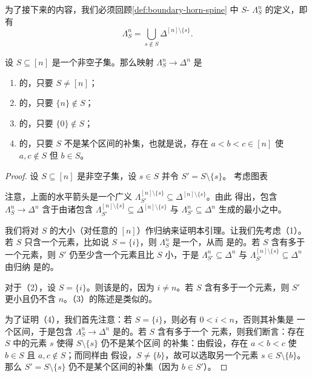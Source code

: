 为了接下来的内容，我们必须回顾\cref{def:boundary-horn-spine} 中 $S$-\trHorn{}%
$\Lambda^n_S$ 的定义，即有
\[
\Lambda^n_S = \bigcup_{s \notin S} \Delta^{[n]\setminus\{s\}}.
\]

\begin{lemma}\label{lem:s-horn-anodyne}
设 $S \subseteq [n]$ 是一个非空子集。那么映射 $\Lambda^n_S \to \Delta^n$ 是
\begin{enumerate}[label=(\arabic*)]
  \item \trAnodyne{}的，只要 $S \ne [n]$；
  \item \trLeftAnodyne{}的，只要 $\{n\} \notin S$；
  \item \trRightAnodyne{}的，只要 $\{0\} \notin S$；
  \item \trInnerAnodyne{}的，只要 $S$ 不是某个区间的补集，也就是说，存在
  $a < b < c \in [n]$ 使 $a, c \notin S$ 但 $b \in S$。
\end{enumerate}
\end{lemma}

\begin{proof}
设 $S \subseteq [n]$ 是非空子集，设 $s \in S$ 并令 $S' = S \setminus \{s\}$。
考虑\trPushout{}图表
\begin{center}
\end{center}
注意，上面的水平箭头是一个广义\trHornInclusion{}%
$\Lambda^{[n]\setminus\{s\}}_{S'} \subseteq \Delta^{[n]\setminus\{s\}}$。由此
得出，包含 $\Lambda^n_S \to \Delta^n$ 含于由诸包含
$\Lambda^{[n]\setminus\{s\}}_{S'} \subseteq \Delta^{[n]\setminus\{s\}}$ 与
$\Lambda^n_{S'} \subseteq \Delta^n$ 生成的最小\trSaturatedSet{}之中。

我们将对 $S$ 的大小（对任意的 $[n]$）作归纳来证明本引理。让我们先考虑（1）。若
$S$ 只含一个元素，比如说 $S = \{i\}$，则 $\Lambda^n_S$ 是一个\trHornInclusion{}，从而
是\trAnodyne{}的。若 $S$ 含有多于一个元素，则 $S'$ 仍至少含一个元素且比 $S$ 小，于是
$\Lambda^n_{S'} \subseteq \Delta^n$ 与
$\Lambda^{[n]\setminus\{s\}}_{S'} \subseteq \Delta^n$ 由归纳
是\trAnodyne{}的。

对于（2），设 $S = \{i\}$。则该\trHornInclusion{}是\trLeftAnodyne{}的，因为 $i \ne n$。若 $S$
含有多于一个元素，则 $S'$ 更小且仍不含 $n$。（3）的陈述是类似的。

为了证明（4），我们首先注意：若 $S = \{i\}$，则必有 $0 < i < n$，否则其补集是
一个区间，于是包含 $\Lambda^n_S \to \Delta^n$ 是\trInnerAnodyne{}的。若 $S$ 含有多于一个
元素，则我们断言：存在 $S$ 中的元素 $s$ 使得 $S \setminus \{s\}$ 仍不是某个区间
的补集：由假设，存在 $a < b < c$ 使 $b \in S$ 且 $a, c \notin S$；而同样由
假设，$S \ne \{b\}$，故可以选取另一个元素 $s \in S \setminus \{b\}$。那么
$S' = S \setminus \{s\}$ 仍不是某个区间的补集（因为 $b \in S'$）。
\end{proof}

